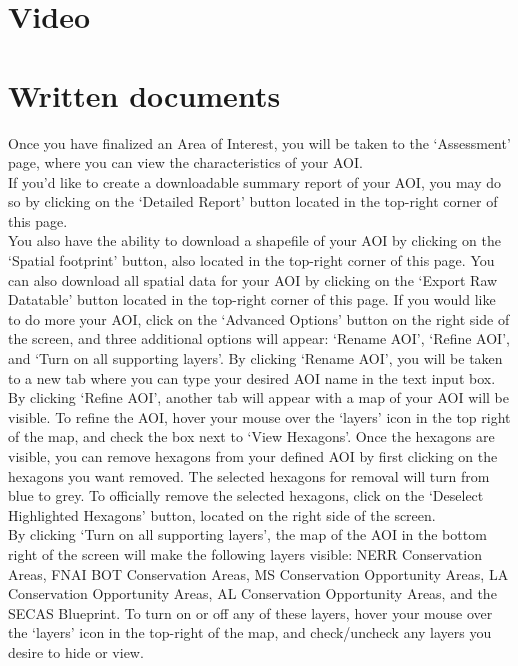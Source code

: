 \documentclass[
]{book}
\begin{document}
\hypertarget{video-2}{%
\section{Video}\label{video-2}}

\hypertarget{written-documents-2}{%
\section{Written documents}\label{written-documents-2}}

Once you have finalized an Area of Interest, you will be taken to the `Assessment' page, where you can view the characteristics of your AOI.\\
If you'd like to create a downloadable summary report of your AOI, you may do so by clicking on the `Detailed Report' button located in the top-right corner of this page.\\
You also have the ability to download a shapefile of your AOI by clicking on the `Spatial footprint' button, also located in the top-right corner of this page.
You can also download all spatial data for your AOI by clicking on the `Export Raw Datatable' button located in the top-right corner of this page.
If you would like to do more your AOI, click on the `Advanced Options' button on the right side of the screen, and three additional options will appear: `Rename AOI', `Refine AOI', and `Turn on all supporting layers'.
By clicking `Rename AOI', you will be taken to a new tab where you can type your desired AOI name in the text input box.\\
By clicking `Refine AOI', another tab will appear with a map of your AOI will be visible. To refine the AOI, hover your mouse over the `layers' icon in the top right of the map, and check the box next to `View Hexagons'. Once the hexagons are visible, you can remove hexagons from your defined AOI by first clicking on the hexagons you want removed. The selected hexagons for removal will turn from blue to grey. To officially remove the selected hexagons, click on the `Deselect Highlighted Hexagons' button, located on the right side of the screen.\\
By clicking `Turn on all supporting layers', the map of the AOI in the bottom right of the screen will make the following layers visible: NERR Conservation Areas, FNAI BOT Conservation Areas, MS Conservation Opportunity Areas, LA Conservation Opportunity Areas, AL Conservation Opportunity Areas, and the SECAS Blueprint. To turn on or off any of these layers, hover your mouse over the `layers' icon in the top-right of the map, and check/uncheck any layers you desire to hide or view.
\end{document}
